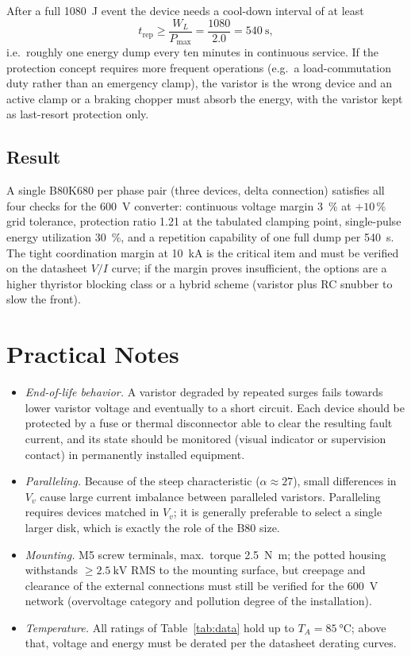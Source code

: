 \documentclass[11pt,a4paper]{article}
\begin{document}
After a full \SI{1080}{\joule} event the device needs a cool-down interval
of at least
%
\begin{equation}
  t_\mathrm{rep} \geq \frac{W_L}{P_\mathrm{max}}
  = \frac{1080}{2.0} = \SI{540}{\second} ,
\end{equation}
%
i.e.\ roughly one energy dump every ten minutes in continuous service. If
the protection concept requires more frequent operations (e.g.\ a
load-commutation duty rather than an emergency clamp), the varistor is the
wrong device and an active clamp or a braking chopper must absorb the
energy, with the varistor kept as last-resort protection only.

\subsection{Result}

A single B80K680 per phase pair (three devices, delta connection) satisfies
all four checks for the \SI{600}{\volt} converter: continuous voltage margin
\SI{3}{\percent} at $+10\,\%$ grid tolerance, protection ratio 1.21 at the
tabulated clamping point, single-pulse energy utilization \SI{30}{\percent},
and a repetition capability of one full dump per \SI{540}{\second}. The
tight coordination margin at \SI{10}{\kilo\ampere} is the critical item and
must be verified on the datasheet $V/I$ curve; if the margin proves
insufficient, the options are a higher thyristor blocking class or a hybrid
scheme (varistor plus RC snubber to slow the front).

\section{Practical Notes}

\begin{itemize}
  \item \emph{End-of-life behavior.} A varistor degraded by repeated surges
  fails towards lower varistor voltage and eventually to a short circuit.
  Each device should be protected by a fuse or thermal disconnector able to
  clear the resulting fault current, and its state should be monitored
  (visual indicator or supervision contact) in permanently installed
  equipment.
  \item \emph{Paralleling.} Because of the steep characteristic
  ($\alpha \approx 27$), small differences in $V_v$ cause large current
  imbalance between paralleled varistors. Paralleling requires devices
  matched in $V_v$; it is generally preferable to select a single larger
  disk, which is exactly the role of the B80 size.
  \item \emph{Mounting.} M5 screw terminals, max.\ torque
  \SI{2.5}{\newton\meter}; the potted housing withstands
  $\geq\SI{2.5}{\kilo\volt}$ RMS to the mounting surface, but creepage and
  clearance of the external connections must still be verified for the
  \SI{600}{\volt} network (overvoltage category and pollution degree of the
  installation).
  \item \emph{Temperature.} All ratings of Table~\ref{tab:data} hold up to
  $T_A = \SI{85}{\celsius}$; above that, voltage and energy must be derated
  per the datasheet derating curves.
\end{itemize}
\end{document}
